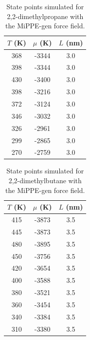 \documentclass[journal=jctc,manuscript=article]{achemso}
\begin{document}
\begin{table}[htb!]
	\caption{State points simulated for 2,2-dimethylpropane with the MiPPE-gen force field.}
	\begin{center}
		\begin{tabular}{|c|c|c|}
			\hline
			$T$ (K) & $\mu$ (K) & $L$ (nm) \\ \hline
			368	&	-3344	&	3.0	\\
			398	&	-3344	&	3.0	\\
			430	&	-3400	&	3.0	\\
			398	&	-3216	&	3.0	\\
			372	&	-3124	&	3.0	\\
			346	&	-3032	&	3.0	\\
			326	&	-2961	&	3.0	\\
			299	&	-2865	&	3.0	\\
			270	&	-2759	&	3.0	\\
			\hline
		\end{tabular}
	\end{center}
\end{table}

\begin{table}[htb!]
	\caption{State points simulated for 2,2-dimethylbutane with the MiPPE-gen force field.}
	\begin{center}
		\begin{tabular}{|c|c|c|}
			\hline
			$T$ (K) & $\mu$ (K) & $L$ (nm) \\ \hline
			415	&	-3873	&	3.5	\\
			445	&	-3873	&	3.5	\\
			480	&	-3895	&	3.5	\\
			450	&	-3756	&	3.5	\\
			420	&	-3654	&	3.5	\\
			400	&	-3588	&	3.5	\\
			380	&	-3521	&	3.5	\\
			360	&	-3454	&	3.5	\\
			340	&	-3384	&	3.5	\\
			310	&	-3380	&	3.5	\\
			\hline
		\end{tabular}
	\end{center}
\end{table}
\end{document}

